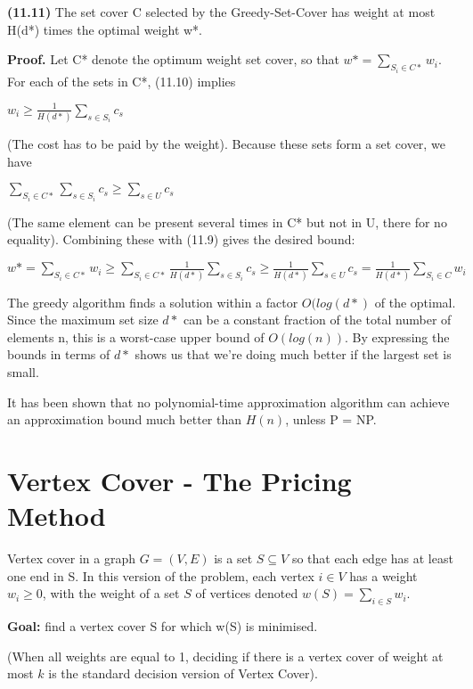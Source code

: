 \documentclass{proc}
\begin{document}
\begin{mdframed}
    \textbf{(11.11)} The set cover C selected by the Greedy-Set-Cover has weight at most H(d*) times the optimal weight w*.
    
    \textbf{Proof.} Let C* denote the optimum weight set cover, so that $w* = \sum_{S_i \in C*} w_i$. For each of the sets in C*, (11.10) implies
    
    $w_i \ge \frac{1}{H(d*)} \sum_{s \in S_i} c_s$
    
    (The cost has to be paid by the weight). Because these sets form a set cover, we have
    
    $\sum_{S_i \in C*} \sum_{s \in S_i} c_s \ge \sum_{s \in U} c_s$
    
    (The same element can be present several times in C* but not in U, there for no equality). Combining these with (11.9) gives the desired bound:
    
    $w* = \sum_{S_i \in C*} w_i \ge \sum_{S_i \in C*} \frac{1}{H(d*)} \sum_{s \in S_i} c_s \ge \frac{1}{H(d*)} \sum_{s \in U} c_s = \frac{1}{H(d*)} \sum_{S_i \in C} w_i$
\end{mdframed}

The greedy algorithm finds a solution within a factor $O(log(d*)$ of the optimal. Since the maximum set size $d*$ can be a constant fraction of the total number of elements n, this is a worst-case upper bound of $O(log(n))$. By expressing the bounds in terms of $d*$ shows us that we're doing much better if the largest set is small.

It has been shown that no polynomial-time approximation algorithm can achieve an approximation bound much better than $H(n)$, unless P = NP. 

\section{Vertex Cover - The Pricing Method}

Vertex cover in a graph $G = (V,E)$ is a set $S \subseteq V$ so that each edge has at least one end in S. In this version of the problem, each vertex $i \in V$ has a weight $w_i \ge 0$, with the weight of a set $S$ of vertices denoted $w(S) = \sum_{i \in S} w_i$. 

\begin{mdframed}
    \textbf{Goal:} find a vertex cover S for which w(S) is minimised.
\end{mdframed}

(When all weights are equal to 1, deciding if there is a vertex cover of weight at most $k$ is the standard decision version of Vertex Cover).
\end{document}

